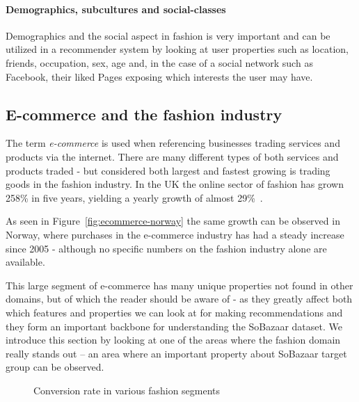 \paragraph{Demographics, subcultures and social-classes}
Demographics and the social aspect in fashion is very important and can be
utilized in a recommender system by looking at user properties such as
location, friends, occupation, sex, age and, in the case of a social network
such as Facebook, their liked Pages exposing which interests the user may have.


\subsection{E-commerce and the fashion industry}
\label{sec:fashionInEcom}

The term \textit{e-commerce} is used when referencing businesses trading
services and products via the internet. There are many different types of both
services and products traded - but considered both largest and fastest growing
is trading goods in the fashion industry. In the UK the online sector of
fashion has grown 258\% in five years, yielding a yearly growth of almost
29\%~\cite{Divante2014}.

As seen in Figure~\ref{fig:ecommerce-norway} the same growth can be observed in
Norway, where purchases in the e-commerce industry has had a steady increase
since 2005 - although no specific numbers on the fashion industry alone are
available.

This large segment of e-commerce has many unique properties not found in other
domains, but of which the reader should be aware of - as they greatly affect
both which features and properties we can look at for making recommendations
and they form an important backbone for understanding the SoBazaar dataset.
We introduce this section by looking at one of the areas where the fashion
domain really stands out -- an area where an important property about SoBazaar
target group can be observed.

\begin{figure}[H]
    \centering
    \caption{Conversion rate in various fashion segments}
    \label{fig:conversionRateFashion}
\end{figure}

